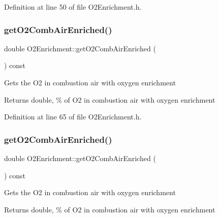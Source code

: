 Definition at line 50 of file O2\+Enrichment.\+h.

\mbox{\label{class_o2_enrichment_a0e9a9ec7987eaa673cb9527b293ded7c}} 
\subsubsection{\texorpdfstring{get\+O2\+Comb\+Air\+Enriched()}{getO2CombAirEnriched()}\hspace{0.1cm}{\footnotesize\ttfamily [1/3]}}
{\footnotesize\ttfamily double O2\+Enrichment\+::get\+O2\+Comb\+Air\+Enriched (\begin{DoxyParamCaption}{ }\end{DoxyParamCaption}) const\hspace{0.3cm}{\ttfamily [inline]}}

Gets the O2 in combustion air with oxygen enrichment \begin{DoxyReturn}{Returns}
double, \% of O2 in combustion air with oxygen enrichment 
\end{DoxyReturn}


Definition at line 65 of file O2\+Enrichment.\+h.

\mbox{\label{class_o2_enrichment_a0e9a9ec7987eaa673cb9527b293ded7c}} 
\subsubsection{\texorpdfstring{get\+O2\+Comb\+Air\+Enriched()}{getO2CombAirEnriched()}\hspace{0.1cm}{\footnotesize\ttfamily [2/3]}}
{\footnotesize\ttfamily double O2\+Enrichment\+::get\+O2\+Comb\+Air\+Enriched (\begin{DoxyParamCaption}{ }\end{DoxyParamCaption}) const\hspace{0.3cm}{\ttfamily [inline]}}

Gets the O2 in combustion air with oxygen enrichment \begin{DoxyReturn}{Returns}
double, \% of O2 in combustion air with oxygen enrichment 
\end{DoxyReturn}


